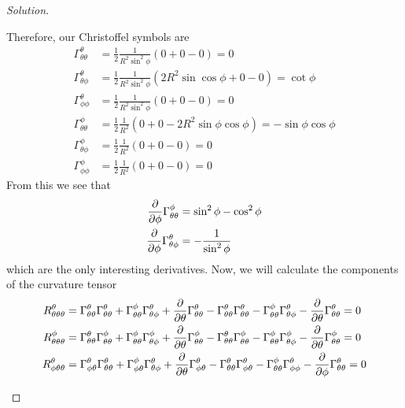 \documentclass[a4paper]{article}
\begin{document}
\begin{proof}[Solution]
\begin{enumerate}[(a)]
\[  \]
  Therefore, our Christoffel symbols are
  \[
    \begin{aligned}
      \Gamma_{\theta \theta}^\theta &= \frac{1}{2}\frac{1}{R^2 \sin^2 \phi} \left(0 +  0 - 0\right) = 0 \\
      \Gamma_{\theta \phi}^\theta &=  \frac{1}{2} \frac{1}{R^2 \sin^2 \phi} \left(2R^2 \sin \cos\phi + 0 - 0  \right) = \cot\phi \\
      \Gamma_{\phi \phi}^\theta &= \frac{1}{2} \frac{1}{R^2 \sin^2 \phi} \left(0 + 0 - 0  \right) = 0 \\
      \Gamma_{\theta \theta}^\phi &= \frac{1}{2} \frac{1}{R^2} \left(0 + 0 - 2R^2 \sin \phi \cos \phi \right) = -\sin \phi \cos \phi \\
      \Gamma_{\theta \phi}^\phi &= \frac{1}{2} \frac{1}{R^2} \left(0 + 0 - 0\right) = 0 \\
      \Gamma_{\phi \phi}^\phi &= \frac{1}{2} \frac{1}{R^2} \left( 0 + 0 - 0 \right) = 0
    \end{aligned}
  \]
  From this we see that
  \[
    \begin{aligned}
      \pdv{\phi} \Gamma_{\theta \theta}^\phi &= \sin^2 \phi - \cos^2 \phi \\
      \pdv{\phi} \Gamma_{\theta \phi}^\theta &= - \frac{1}{\sin^2 \phi} 
    \end{aligned}
  \]
  which are the only interesting derivatives. Now, we will calculate the components of the curvature tensor
  \[
    \begin{aligned}
      R_{\theta \theta \theta}^\theta &= \Gamma_{\theta \theta}^\theta \Gamma_{\theta \theta}^\theta + \Gamma_{\theta \theta}^\phi \Gamma_{\theta \phi}^{\theta} + \pdv{\theta} \Gamma_{\theta \theta}^\theta - \Gamma_{\theta \theta}^\theta \Gamma_{\theta \theta}^\theta - \Gamma_{\theta \theta}^\phi \Gamma_{\theta \phi}^\theta - \pdv{\theta} \Gamma_{\theta \theta}^\theta = 0\\
      R_{\theta \theta \theta}^\phi &= \Gamma_{\theta \theta}^\theta \Gamma_{\theta \theta}^\phi + \Gamma_{\theta \theta}^\phi \Gamma_{\theta \phi}^\phi + \pdv{\theta} \Gamma_{\theta \theta}^\phi - \Gamma_{\theta \theta}^\theta \Gamma_{\theta \theta}^\phi  - \Gamma_{\theta \theta}^\phi \Gamma_{\theta \phi}^\phi - \pdv{\theta} \Gamma_{\theta \theta}^\phi = 0 \\
      R_{\phi \theta \theta}^\theta &= \Gamma_{\phi \theta}^\theta \Gamma_{\theta \theta}^\theta + \Gamma_{\phi \theta}^\phi \Gamma_{\theta \phi}^\theta + \pdv{\theta} \Gamma_{\phi \theta}^\theta - \Gamma_{\theta \theta}^\theta \Gamma_{\phi \theta}^\theta  - \Gamma_{\theta \theta}^\phi \Gamma_{\phi \phi}^\theta - \pdv{\phi} \Gamma_{\theta \theta}^\theta = 0 \\

\end{aligned}\]
\end{enumerate}
\end{proof}
\end{document}
